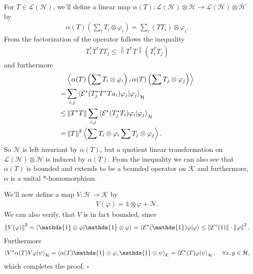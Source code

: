 \documentclass[a4paper,12pt]{wihuri}
\theoremstyle{definition}
\numberwithin{definition}{section}
\numberwithin{example}{section}
\numberwithin{theorem}{section}
\numberwithin{proposition}{section}
\numberwithin{lemma}{section}
\newcommand{\hi}{\mathcal{H}}%
\newcommand{\ki}{\mathcal{K}}%
\newcommand{\lin}{\mathcal{L}}%
\newcommand{\EC}{\mathcal{E}}
\newcommand{\id}{\mathds{1}}
\newcommand{\norm}[1]{\left\lVert#1\right\rVert}
\begin{document}
For $T \in \lin(\hi)$, we'll define a linear map $\alpha(T) : \lin(\hi)\otimes\hi \rightarrow \lin(\hi)\otimes\hi$ by
\begin{align*}
\alpha(T)\left( \sum_i T_i \otimes \varphi_i \right) = \sum_i(TT_i)\otimes \varphi_i\text{.}
\end{align*}
From the factorization of the operator follows the inequality
\begin{align*}
T_i^*T^*TT_j \leq \norm{T^*T}(T_i^*T_j)
\end{align*}
and furthermore
\begin{align*}
&\left\langle \alpha(T)\left(\sum T_i \otimes \varphi_i\right), \alpha(T)\left(\sum T_j \otimes \varphi_j \right)\right\rangle \\
=&\sum_{i,j}\braket{\EC^*(T_j^*T^*Ta_i)\varphi_j | \varphi_j}_{\hi} \\
\leq & \norm{T^*T}\sum_{i,j}\braket{\EC^*(T_j^*T_i)\varphi_i |\varphi_j }_{\hi}\\
=&\norm{T}^2 \left\langle\sum T_i \otimes \varphi_i  \sum T_j \otimes \varphi_j \right\rangle\text{.}
\end{align*}
So $\mathcal{N}$ is left invariant by $\alpha(T)$, but a quotient linear transformation on $\lin(\hi) \otimes \hi$ is induced by $\alpha(T)$. From the inequality we can also see that $\alpha(T)$ is bounded and extends to be a bounded operator on $\ki$ and furthermore, $\alpha$ is a unital $\ast$-homomorphism.

We'll now define a map $V: \hi \rightarrow \ki$ by
\begin{align*}
V(\varphi) = \id \otimes \varphi + \mathcal{N}\text{.}
\end{align*}
We can also verify, that $V$ is in fact bounded, since
\begin{align*}
\norm{V(\varphi)}^2 = \braket{\id\otimes\varphi | \id\otimes\varphi} = \braket{\EC^*(\id)\varphi | \varphi} \leq \norm{\EC^*(1)}\cdot\norm{\varphi}^2\text{.}
\end{align*}
Furthermore
\begin{align*}
\braket{V^*\alpha(T)V\varphi | \psi}_{\hi} = \braket{\alpha(T)\id \otimes \varphi, \id \otimes \psi}_{\ki} = \braket{\EC^*(T)\varphi | \psi}_{\hi}, \quad \forall x,y \in \hi,
\end{align*}
which completes the proof. \hfill $\square$
\end{document}
